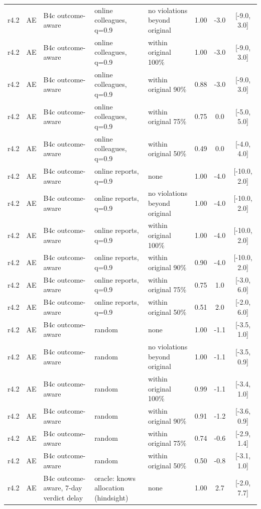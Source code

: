 \begin{longtable}{lllp{4.2cm}p{3.4cm}ccc}
r4.2 & AE & B4c outcome-aware & online colleagues, q=0.9 & no violations beyond original & 1.00 & -3.0 & [-9.0, 3.0] \\
r4.2 & AE & B4c outcome-aware & online colleagues, q=0.9 & within original 100\% & 1.00 & -3.0 & [-9.0, 3.0] \\
r4.2 & AE & B4c outcome-aware & online colleagues, q=0.9 & within original 90\% & 0.88 & -3.0 & [-9.0, 3.0] \\
r4.2 & AE & B4c outcome-aware & online colleagues, q=0.9 & within original 75\% & 0.75 & 0.0 & [-5.0, 5.0] \\
r4.2 & AE & B4c outcome-aware & online colleagues, q=0.9 & within original 50\% & 0.49 & 0.0 & [-4.0, 4.0] \\
r4.2 & AE & B4c outcome-aware & online reports, q=0.9 & none & 1.00 & -4.0 & [-10.0, 2.0] \\
r4.2 & AE & B4c outcome-aware & online reports, q=0.9 & no violations beyond original & 1.00 & -4.0 & [-10.0, 2.0] \\
r4.2 & AE & B4c outcome-aware & online reports, q=0.9 & within original 100\% & 1.00 & -4.0 & [-10.0, 2.0] \\
r4.2 & AE & B4c outcome-aware & online reports, q=0.9 & within original 90\% & 0.90 & -4.0 & [-10.0, 2.0] \\
r4.2 & AE & B4c outcome-aware & online reports, q=0.9 & within original 75\% & 0.75 & 1.0 & [-3.0, 6.0] \\
r4.2 & AE & B4c outcome-aware & online reports, q=0.9 & within original 50\% & 0.51 & 2.0 & [-2.0, 6.0] \\
r4.2 & AE & B4c outcome-aware & random & none & 1.00 & -1.1 & [-3.5, 1.0] \\
r4.2 & AE & B4c outcome-aware & random & no violations beyond original & 1.00 & -1.1 & [-3.5, 0.9] \\
r4.2 & AE & B4c outcome-aware & random & within original 100\% & 0.99 & -1.1 & [-3.4, 1.0] \\
r4.2 & AE & B4c outcome-aware & random & within original 90\% & 0.91 & -1.2 & [-3.6, 0.9] \\
r4.2 & AE & B4c outcome-aware & random & within original 75\% & 0.74 & -0.6 & [-2.9, 1.4] \\
r4.2 & AE & B4c outcome-aware & random & within original 50\% & 0.50 & -0.8 & [-3.1, 1.0] \\
r4.2 & AE & B4c outcome-aware, 7-day verdict delay & oracle: knows allocation (hindsight) & none & 1.00 & 2.7 & [-2.0, 7.7] \\

\end{longtable}
